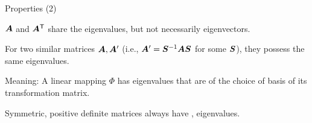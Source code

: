 \documentclass[fleqn,aspectratio=169]{beamer}
\begin{document}
\begin{frame}{Properties (2)}

\plitemsep 0.2in

\bci
\item $\bm{A}$ and ${\bm{A}}^{\mathsf{T}}$ share the eigenvalues, but not necessarily eigenvectors. 

\item For two similar matrices $\bm{A},\bm{A}'$ (i.e., $\bm{A}' = {{\bm{S}}^{-1}}\bm{A} \bm{S}$ for some $\bm{S}$), they possess the same eigenvalues. 

\bci
\item Meaning: A linear mapping $\Phi$ has eigenvalues that are  of the choice of basis of its transformation matrix. 


\item Symmetric, positive definite matrices always have ,  eigenvalues.
\eci
\eci



\end{frame}
\end{document}
